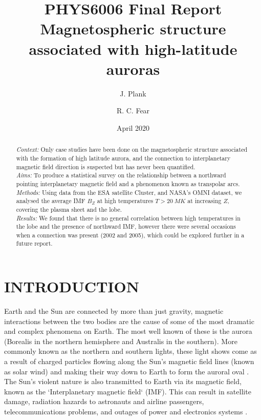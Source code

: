 \documentclass[12pt]{article}
\title{PHYS6006 Final Report \\
       Magnetospheric structure associated with high-latitude auroras}
\author[1]{J. Plank}
\author[2]{R. C. Fear}
\affil[1, 2]{Department of Physics and Astronomy, University of Southampton}
\date{April 2020}
\begin{document}
\sloppy
\maketitle

\begin{abstract}
    \noindent\textit{Context:} Only case studies have been done on the magnetospheric structure associated with the formation of high latitude aurora, and the connection to interplanetary magnetic field direction is suspected but has never been quantified.\\
    \textit{Aims:} To produce a statistical survey on the relationship between a northward pointing interplanetary magnetic field and a phenomenon known as transpolar arcs.\\
    \textit{Methods:} Using data from the ESA satellite Cluster, and NASA's OMNI dataset, we analysed the average IMF $B_Z$ at high temperatures $T>20\ MK$ at increasing $Z$, covering the plasma sheet and the lobe. \\
    \textit{Results:} We found that there is no general correlation between high temperatures in the lobe and the presence of northward IMF, however there were several occasions when a connection was present (2002 and 2005), which could be explored further in a future report.
\end{abstract}

\pagebreak

\tableofcontents
{}

\pagebreak


\section{INTRODUCTION}
Earth and the Sun are connected by more than just gravity, magnetic interactions between the two bodies are the cause of some of the most dramatic and complex phenomena on Earth. The most well known of these is the aurora (Borealis in the northern hemisphere and Australis in the southern). More commonly known as the northern and southern lights, these light shows come as a result of charged particles flowing along the Sun's magnetic field lines (known as solar wind) and making their way down to Earth to form the auroral oval \cite{AAAspaceweather}. The Sun's violent nature is also transmitted to Earth via its magnetic field, known as the `Interplanetary magnetic field` (IMF). This can result in satellite damage, radiation hazards to astronauts and airline passengers, telecommunications problems, and outages of power and electronics systems \cite{AAAspaceweather}.
\end{document}
